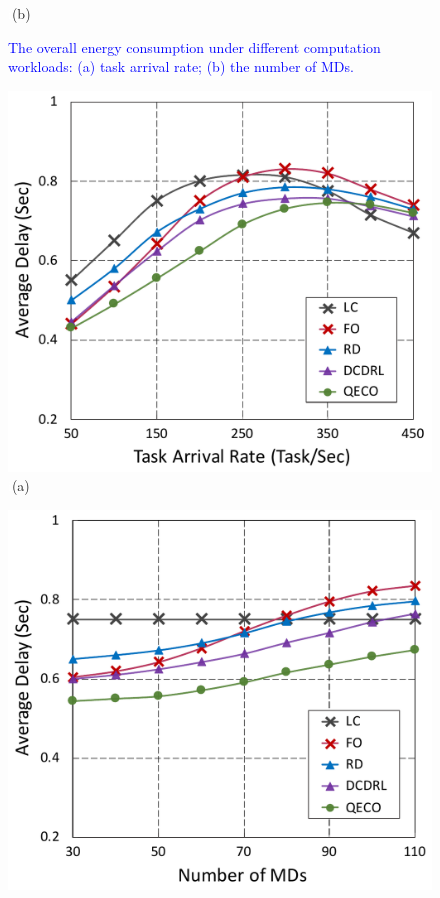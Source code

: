 \documentclass[12pt,draftclsnofoot,onecolumn]{IEEEtran}
\begin{document}
\begin{enumerate}
\begin{figure}[H]
\begin{minipage}[b]{0.33\linewidth}
		\textcolor{white}{i}\hspace{0.6cm}(b)
	\end{minipage}
	
	\caption{\textcolor{blue}{The overall energy consumption under different computation workloads: (a) task arrival rate; (b) the number of MDs.}}
	\label{chart2}
\end{figure}\vspace{-12mm}
\begin{figure}[H]\centering
	\captionsetup{name=Fig.}
	\begin{minipage}[b]{0.33\linewidth}
		\centering
		\includegraphics[width=\textwidth]{ delay_1} 		
		\textcolor{white}{i}\hspace{0.6cm}(a)
	\end{minipage}
	\hspace{-0.2cm}
	\begin{minipage}[b]{0.33\linewidth}
		\centering
		\includegraphics[width=\textwidth]{ delay_2}

\end{minipage}
\end{figure}
\end{enumerate}
\end{document}
